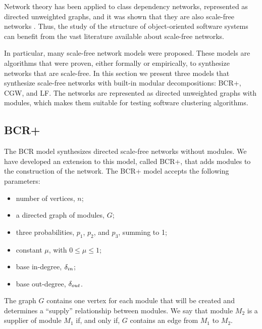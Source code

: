Network theory has been applied to class dependency networks, represented as
directed unweighted graphs, and it was shown that they are also scale-free
networks \cite{Myers2003,Valverde2002}. Thus, the study of the structure of
object-oriented software systems can benefit from the vast literature available
about scale-free networks.

In particular, many scale-free network models were proposed. These models are
algorithms that were proven, either formally or empirically, to synthesize
networks that are scale-free. In this section we present three models that
synthesize scale-free networks with built-in modular decompositions: BCR+, CGW,
and LF. The networks are represented as directed unweighted graphs with modules,
which makes them suitable for testing software clustering algorithms.



\subsection{BCR+}

The BCR model \cite{Bollobas2003} synthesizes directed scale-free networks
without modules. We have developed an extension to this model, called BCR+, that
adds modules to the construction of the network. The BCR+ model accepts the
following parameters:

\begin{itemize}
\item number of vertices, $n$;
\item a directed graph of modules, $G$;
\item three probabilities, $p_1$, $p_2$, and $p_3$, summing to 1;
\item constant $\mu$, with $0 \le \mu \le 1$;
\item base in-degree, $\delta_{in}$;
\item base out-degree, $\delta_{out}$.
\end{itemize}

The graph $G$ contains one vertex for each module that will be created and
determines a ``supply'' relationship between modules. We say that module $M_2$
is a supplier of module $M_1$ if, and only if, $G$ contains an edge from $M_1$
to $M_2$.  

